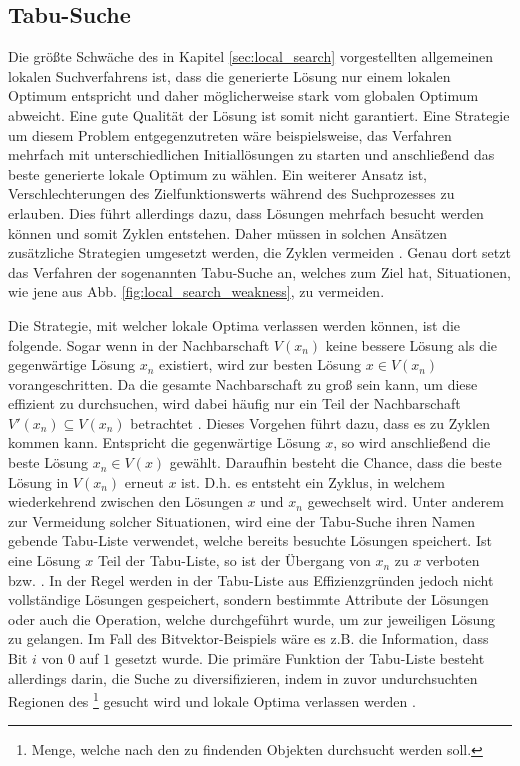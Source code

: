 \pagebreak

\subsection{Tabu-Suche}
\label{sec:tabu_search}

Die größte Schwäche des in Kapitel \ref{sec:local_search} vorgestellten allgemeinen lokalen Suchverfahrens
ist, dass die generierte Lösung nur einem lokalen Optimum entspricht und daher möglicherweise stark vom globalen
Optimum abweicht. Eine gute Qualität der Lösung ist somit nicht garantiert.
Eine Strategie um diesem Problem entgegenzutreten wäre beispielsweise, das Verfahren mehrfach mit unterschiedlichen
Initiallösungen zu starten und anschließend das beste generierte lokale Optimum zu wählen.
Ein weiterer Ansatz ist, Verschlechterungen des Zielfunktionswerts während des Suchprozesses zu erlauben.
Dies führt allerdings dazu, dass Lösungen mehrfach besucht werden können und somit Zyklen entstehen.
Daher müssen in solchen Ansätzen zusätzliche Strategien umgesetzt werden, die Zyklen vermeiden \cite{Brucker2006}.
Genau dort setzt das Verfahren der sogenannten Tabu-Suche an, welches zum Ziel hat, Situationen, wie jene aus
Abb. \ref{fig:local_search_weakness}, zu vermeiden.

Die Strategie, mit welcher lokale Optima verlassen werden können, ist die folgende.
Sogar wenn in der Nachbarschaft $V(x_n)$ keine bessere Lösung als die gegenwärtige Lösung $x_n$ existiert,
wird zur besten Lösung $x \in V(x_n)$ vorangeschritten.
Da die gesamte Nachbarschaft zu groß sein kann, um diese effizient zu durchsuchen,
wird dabei häufig nur ein Teil der Nachbarschaft $V'(x_n) \subseteq V(x_n)$ betrachtet \cite{Pirlot1996}.
Dieses Vorgehen führt dazu, dass es zu Zyklen kommen kann. Entspricht die gegenwärtige Lösung $x$,
so wird anschließend die beste Lösung $x_n \in V(x)$ gewählt. Daraufhin besteht die Chance,
dass die beste Lösung in $V(x_n)$ erneut $x$ ist. D.h. es entsteht ein Zyklus, in welchem wiederkehrend
zwischen den Lösungen $x$ und $x_n$ gewechselt wird.
Unter anderem zur Vermeidung solcher Situationen, wird eine der Tabu-Suche ihren Namen gebende Tabu-Liste verwendet,
welche bereits besuchte Lösungen speichert. Ist eine Lösung $x$ Teil der Tabu-Liste, so ist der Übergang
von $x_n$ zu $x$ verboten bzw. .
In der Regel werden in der Tabu-Liste aus Effizienzgründen jedoch nicht vollständige Lösungen gespeichert, sondern
bestimmte Attribute der Lösungen oder auch die Operation, welche durchgeführt wurde, um zur jeweiligen Lösung zu gelangen. Im Fall des Bitvektor-Beispiels wäre es z.B. die Information, dass Bit $i$ von $0$ auf $1$ gesetzt wurde.
Die primäre Funktion der Tabu-Liste besteht allerdings darin, die Suche zu diversifizieren,
indem in zuvor undurchsuchten Regionen des \footnote{Menge, welche nach den zu findenden Objekten durchsucht werden soll.} gesucht wird und lokale Optima verlassen werden \cite{Pirlot1996}.

